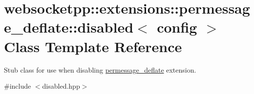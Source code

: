 \hypertarget{classwebsocketpp_1_1extensions_1_1permessage__deflate_1_1disabled}{}\section{websocketpp\+:\+:extensions\+:\+:permessage\+\_\+deflate\+:\+:disabled$<$ config $>$ Class Template Reference}
\label{classwebsocketpp_1_1extensions_1_1permessage__deflate_1_1disabled}


Stub class for use when disabling \mbox{\hyperlink{namespacewebsocketpp_1_1extensions_1_1permessage__deflate}{permessage\+\_\+deflate}} extension.  




{\ttfamily \#include $<$disabled.\+hpp$>$}

